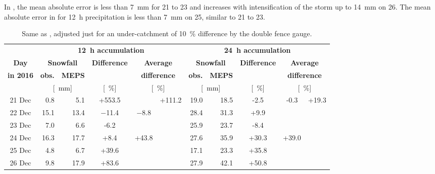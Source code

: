 In , the mean absolute error is less than \SI{7}{\mm} for \num{21} to \SI{23}{\dec} and increases with intensification of the storm up to \SI{14}{\mm} on \SI{26}{\dec}. The mean absolute error in  for \SI{12}{\hour} precipitation is less than \SI{7}{\mm} on \SI{25}{\dec}, similar to \num{21} to \SI{23}{\dec}.
\begin{table}[t]
	\begin{center}
		\caption{Same as , adjusted just for an under-catchment of \SI{10}{\percent} difference by the double fence gauge. }\label{tab:res:MEPS_err_10}
		\begin{tabular}{c||r|r|c|c|c||r|r|c|c|c}
			\hline \hline
			& \multicolumn{5}{c||}{\textbf{\SI{12}{\hour} accumulation}} & \multicolumn{5}{c}{\textbf{\SI{24}{\hour} accumulation}}    \\ \cline{2-11}
			\textbf{Day} & \multicolumn{2}{c|}{\textbf{Snowfall}} & \textbf{Difference} & \multicolumn{2}{c||}{\textbf{Average}} &  \multicolumn{2}{c|}{\textbf{Snowfall}} & \textbf{Difference} & \multicolumn{2}{c}{\textbf{Average}}  \\\cline{2-3} \cline{7-8}
			\textbf{in 2016} & \textbf{obs.} & \textbf{MEPS} & & \multicolumn{2}{c||}{\textbf{difference}} & \textbf{obs.} & \textbf{MEPS} & & \multicolumn{2}{c}{\textbf{difference}} \\\cline{2-11}
			& \multicolumn{2}{c|}{[\SI{}{\mm}]} & [\SI{}{\percent}] & \multicolumn{2}{c||}{ [\SI{}{\percent}]} & \multicolumn{2}{c|}{[\SI{}{\mm}]} & [\SI{}{\percent}] & \multicolumn{2}{c}{ [\SI{}{\percent}]} \\ \hline\hline
			\num{21} Dec & \num{0.8} & \num{5.1} & +\num{553.5} &  &\multirow{6}{*}{+\num{111.2}} & \num{19.0} & \num{18.5} & -\num{2.5} & \multirow{3}{*}{-\num{0.3}}& \multirow{6}{*}{+\num{19.3}}   \\\cline{1-5}\cline{7-9} 
			\num{22} Dec & \num{15.1} & \num{13.4} & \num{-11.4} & \multirow{2}{*}{\num{-8.8}} & & \num{28.4} & \num{31.3} & +\num{9.9} &  &  \\\cline{1-4}\cline{7-9}
			\num{23} Dec & \num{7.0} & \num{6.6} & -\num{6.2} & & & \num{25.9} & \num{23.7} & -\num{8.4} &  &  \\\cline{1-5}\cline{7-10}
			\num{24} Dec & \num{16.3} & \num{17.7} & +\num{8.4} & \multirow{3}{*}{+\num{43.8}} & & \num{27.6} & \num{35.9} & +\num{30.3} & \multirow{3}{*}{+\num{39.0}}  &  \\\cline{1-4}\cline{7-9}
			\num{25} Dec & \num{4.8} & \num{6.7} & +\num{39.6} & & & \num{17.1} & \num{23.3} & +\num{35.8} & &   \\\cline{1-4}\cline{7-9}
			\num{26} Dec & \num{9.8} & \num{17.9} & +\num{83.6} & & & \num{27.9} & \num{42.1} & +\num{50.8} &  &  \\\hline\hline
		\end{tabular}
	\end{center}
\end{table}
